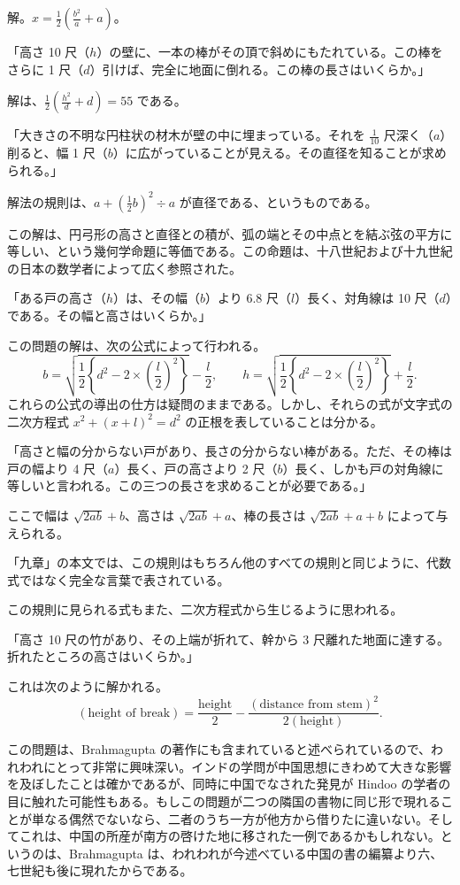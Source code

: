 \documentclass[11pt]{article}
\newcommand{\scanpage}[2]{\clearpage\setcounter{footnote}{0}\noindent{\footnotesize\color{gray}PDF #1 頁 · #2}\par\medskip}
\newcommand{\scanfooter}{}
\begin{document}
解。$x=\frac12\left(\frac{b^2}{a}+a\right)$。

「高さ 10 尺（$h$）の壁に、一本の棒がその頂で斜めにもたれている。この棒をさらに 1 尺（$d$）引けば、完全に地面に倒れる。この棒の長さはいくらか。」

解は、$\frac12\left(\frac{h^2}{d}+d\right)=55$ である。

「大きさの不明な円柱状の材木が壁の中に埋まっている。それを $\frac1{10}$ 尺深く（$a$）削ると、幅 1 尺（$b$）に広がっていることが見える。その直径を知ることが求められる。」

解法の規則は、$a+\left(\frac12 b\right)^2\div a$ が直径である、というものである。

この解は、円弓形の高さと直径との積が、弧の端とその中点とを結ぶ弦の平方に等しい、という幾何学命題に等価である。この命題は、十八世紀および十九世紀の日本の数学者によって広く参照された。
\scanfooter

\scanpage{0037}{第三章、印刷頁23}
「ある戸の高さ（$h$）は、その幅（$b$）より 6.8 尺（$l$）長く、対角線は 10 尺（$d$）である。その幅と高さはいくらか。」

この問題の解は、次の公式によって行われる。
\[
b=\sqrt{\frac12\left\{d^2-2\times\left(\frac l2\right)^2\right\}}-\frac l2,
\qquad
h=\sqrt{\frac12\left\{d^2-2\times\left(\frac l2\right)^2\right\}}+\frac l2.
\]
これらの公式の導出の仕方は疑問のままである。しかし、それらの式が文字式の二次方程式 $x^2+(x+l)^2=d^2$ の正根を表していることは分かる。

「高さと幅の分からない戸があり、長さの分からない棒がある。ただ、その棒は戸の幅より 4 尺（$a$）長く、戸の高さより 2 尺（$b$）長く、しかも戸の対角線に等しいと言われる。この三つの長さを求めることが必要である。」

ここで幅は $\sqrt{2ab}+b$、高さは $\sqrt{2ab}+a$、棒の長さは $\sqrt{2ab}+a+b$ によって与えられる。

「九章」の本文では、この規則はもちろん他のすべての規則と同じように、代数式ではなく完全な言葉で表されている。

この規則に見られる式もまた、二次方程式から生じるように思われる。

「高さ 10 尺の竹があり、その上端が折れて、幹から 3 尺離れた地面に達する。折れたところの高さはいくらか。」

これは次のように解かれる。
\[
(\text{height of break})=\frac{\text{height}}{2}-\frac{(\text{distance from stem})^2}{2(\text{height})}.
\]

この問題は、Brahmagupta の著作にも含まれていると述べられているので、われわれにとって非常に興味深い。インドの学問が中国思想にきわめて大きな影響を及ぼしたことは確かであるが、同時に中国でなされた発見が Hindoo の学者の目に触れた可能性もある。もしこの問題が二つの隣国の書物に同じ形で現れることが単なる偶然でないなら、二者のうち一方が他方から借りたに違いない。そしてこれは、中国の所産が南方の啓けた地に移された一例であるかもしれない。というのは、Brahmagupta は、われわれが今述べている中国の書の編纂より六、七世紀も後に現れたからである。
\end{document}
